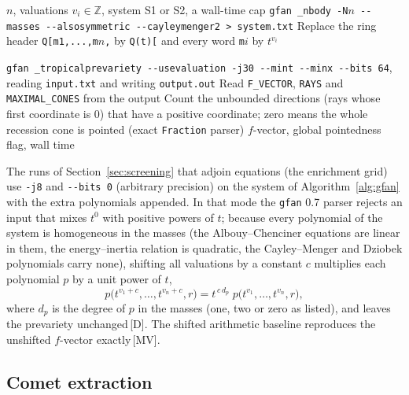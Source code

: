 \documentclass[11pt]{article}
\theoremstyle{definition}
\theoremstyle{remark}
\newcommand{\mk}[1]{\,{\scriptsize[#1]}}
\newcommand{\MV}{\mk{MV}}
\newcommand{\Dm}{\mk{D}}
\begin{document}
\begin{algorithm}[t]
\caption{Tropical prevariety of the $n$-body system for a valuation vector $v=(v_1,\dots,v_n)$.}\label{alg:gfan}
\begin{algorithmic}[1]
\Require $n$, valuations $v_i\in\mathbb{Z}$, system S1 or S2, a wall-time cap
\State \texttt{gfan \_nbody -N$n$ -{}-masses -{}-alsosymmetric -{}-cayleymenger2 > system.txt}
\State Replace the ring header \texttt{Q[m1,...,m$n$,} by \texttt{Q(t)[} and every word \texttt{m}$i$ by $t^{v_i}$
\State \raggedright \texttt{gfan \_tropicalprevariety -{}-usevaluation -j30 -{}-mint -{}-minx -{}-bits 64}, reading \texttt{input.txt} and writing \texttt{output.out}
\State Read \texttt{F\_VECTOR}, \texttt{RAYS} and \texttt{MAXIMAL\_CONES} from the output
\State Count the unbounded directions (rays whose first coordinate is $0$) that have a positive coordinate;
zero means the whole recession cone is pointed (exact \texttt{Fraction} parser)
\Ensure $f$-vector, global pointedness flag, wall time
\end{algorithmic}
\end{algorithm}

The runs of Section~\ref{sec:screening} that adjoin equations (the enrichment grid) use
\texttt{-j8} and \texttt{-{}-bits 0} (arbitrary precision) on the system of Algorithm~\ref{alg:gfan} with
the extra polynomials appended. In that mode the \texttt{gfan} 0.7 parser rejects an input that
mixes $t^0$ with positive powers of $t$; because every polynomial of the system is homogeneous in
the masses (the Albouy--Chenciner equations are linear in them, the energy--inertia relation is
quadratic, the Cayley--Menger and Dziobek polynomials carry none), shifting all valuations by a
constant $c$ multiplies each polynomial $p$ by a unit power of $t$,
\begin{equation}\label{eq:shift}
p\bigl(t^{v_1+c},\dots,t^{v_n+c},r\bigr)=t^{\,c\,d_p}\;p\bigl(t^{v_1},\dots,t^{v_n},r\bigr),
\end{equation}
where $d_p$ is the degree of $p$ in the masses (one, two or zero as listed), and leaves the prevariety unchanged\Dm.
The shifted arithmetic baseline reproduces the unshifted $f$-vector exactly\MV.

\subsection{Comet extraction}
\end{document}
